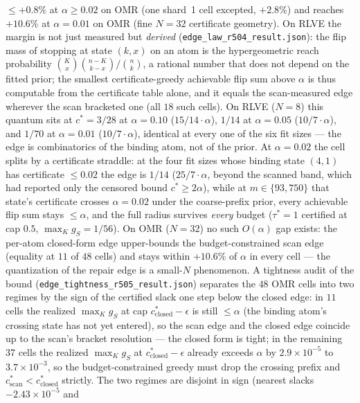 \documentclass{article}
\theoremstyle{definition}
\theoremstyle{remark}
\begin{document}
${\le}+0.8\%$ at $\alpha\ge0.02$ on OMR (one shard~1 cell excepted,
${+}2.8\%$) and reaches ${+}10.6\%$ at
$\alpha{=}0.01$ on OMR (fine $N{=}32$ certificate geometry). On RLVE
the margin is not just measured but \emph{derived}
(\texttt{edge\_law\_r504\_result.json}): the flip mass of stopping at
state $(k,x)$ on an atom is the hypergeometric reach probability
$\binom{K}{x}\binom{n-K}{k-x}/\binom{n}{k}$, a rational number that
does not depend on the fitted prior; the smallest certificate-greedy
achievable flip sum above $\alpha$ is thus computable from the
certificate table alone, and it equals the scan-measured edge wherever
the scan bracketed one (all $18$ such cells). On RLVE ($N{=}8$) this quantum
sits at $c^*{=}3/28$ at $\alpha{=}0.10$ ($15/14\cdot\alpha$), $1/14$
at $\alpha{=}0.05$ ($10/7\cdot\alpha$), and $1/70$ at
$\alpha{=}0.01$ ($10/7\cdot\alpha$), identical at every one of the six
fit sizes --- the edge is combinatorics of the binding atom, not of the
prior. At $\alpha{=}0.02$ the cell splits by a certificate straddle:
at the four fit sizes whose binding state $(4,1)$ has certificate
${\le}0.02$ the edge is $1/14$ ($25/7\cdot\alpha$, beyond the scanned
band, which had reported only the censored bound $c^*{\ge}2\alpha$),
while at $m\in\{93,750\}$ that state's certificate crosses
$\alpha{=}0.02$ under the coarse-prefix prior, every achievable flip
sum stays ${\le}\alpha$, and the full radius survives \emph{every}
budget ($\tau^*{=}1$ certified at cap $0.5$, $\max_K g_S{=}1/56$). On
OMR ($N{=}32$) no such $O(\alpha)$ gap exists: the per-atom
closed-form edge upper-bounds the budget-constrained scan edge
(equality at $11$ of $48$ cells) and stays within ${+}10.6\%$ of
$\alpha$ in every cell --- the quantization of the repair edge is a
small-$N$ phenomenon. A tightness audit of the bound
(\texttt{edge\_tightness\_r505\_result.json}) separates the $48$ OMR
cells into two regimes by the sign of the certified slack one step below
the closed edge: in $11$ cells the realized $\max_K g_S$ at cap
$c^*_{\mathrm{closed}}{-}\epsilon$ is still ${\le}\alpha$ (the
binding atom's crossing state has not yet entered), so the scan edge and
the closed edge coincide up to the scan's bracket resolution --- the
closed form is tight; in the remaining $37$ cells the realized $\max_K
g_S$ at $c^*_{\mathrm{closed}}{-}\epsilon$ already exceeds $\alpha$
by $2.9\times10^{-5}$ to $3.7\times10^{-3}$, so the
budget-constrained greedy must drop the crossing prefix and
$c^*_{\mathrm{scan}}<c^*_{\mathrm{closed}}$ strictly. The two regimes
are disjoint in sign (nearest slacks $-2.43\times10^{-5}$ and
\end{document}
